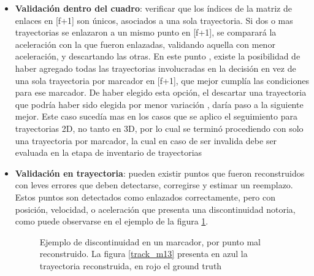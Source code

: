 \begin{itemize}
\item \textbf{Validación dentro del cuadro}: verificar que los índices de la matriz de enlaces en [f+1] son únicos, asociados a una sola trayectoria. Si dos o mas trayectorias se enlazaron a un mismo punto en [f+1], se comparará la aceleración con la que fueron enlazadas, validando aquella con menor aceleración, y descartando las otras. En este punto , existe la posibilidad de haber agregado todas las trayectorias involucradas en la decisión en vez de una sola trayectoria por marcador en [f+1], que mejor cumplía las condiciones para ese marcador. De haber elegido esta opción, el descartar una trayectoria que podría haber sido elegida por menor variación , daría paso a la siguiente mejor. Este caso sucedía mas en los casos que se aplico el seguimiento para trayectorias 2D, no tanto en 3D, por lo cual se terminó procediendo con solo una trayectoria por marcador, la cual en caso de ser invalida debe ser evaluada en la etapa de inventario de trayectorias  
\item \textbf{Validación en trayectoria}: pueden existir puntos que fueron reconstruidos con leves errores que deben detectarse, corregirse y estimar un reemplazo. Estos puntos son detectados como enlazados correctamente, pero con posición, velocidad, o aceleración que presenta una discontinuidad notoria, como puede observarse en el ejemplo de la figura \ref{discontinuidad_tracking}.

\begin{figure}[H]
 \centering
 \caption{Ejemplo de discontinuidad en un marcador, por punto mal reconstruido. La figura \ref{track_m13} presenta en azul la trayectoria reconstruida, en rojo el ground truth}
 \label{discontinuidad_tracking}
\end{figure}


\end{itemize}
